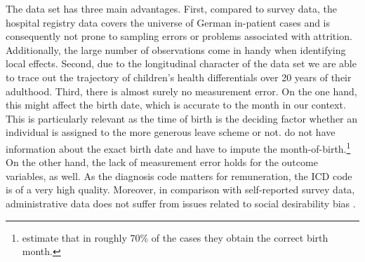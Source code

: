 \documentclass[11pt, a4paper]{article} %
\begin{document}
 

The data set has three main advantages. First, compared to survey data, the hospital registry data covers the universe of German in-patient cases and is consequently not prone to sampling errors or problems associated with attrition. Additionally, the large number of observations come in handy when identifying local effects. Second, due to the longitudinal character of the data set we are able to trace out the trajectory of children's health differentials over 20 years of their adulthood. Third, there is almost surely no measurement error. On the one hand, this might affect the birth date, which is accurate to the month in our context. This is particularly relevant as the time of birth is the deciding factor whether an individual is assigned to the more generous leave scheme or not. \cite{Dustmann2012} do not have information about the exact birth date and have to impute the month-of-birth.\footnote{\cite{Dustmann2012} estimate that in roughly 70\% of the cases they obtain the correct birth month.} On the other hand, the lack of measurement error holds for the outcome variables, as well. As the diagnosis code matters for remuneration, the ICD code is of a very high quality. Moreover, in comparison with self-reported survey data, administrative data does not suffer from issues related to social desirability bias \citep{marcus2015}.\newline
\end{document}
